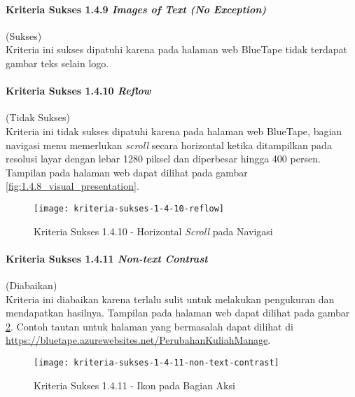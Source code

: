 \paragraph{Kriteria Sukses 1.4.9 \textit{Images of Text (No Exception)}}
\label{par:kepatuhan_bluetape_kriteria_sukses_1.4.9}
(Sukses)\\

Kriteria ini sukses dipatuhi karena pada halaman web BlueTape tidak terdapat gambar teks selain logo.

\paragraph{Kriteria Sukses 1.4.10 \textit{Reflow}}
\label{par:kepatuhan_bluetape_kriteria_sukses_1.4.10}
(Tidak Sukses)\\

Kriteria ini tidak sukses dipatuhi karena pada halaman web BlueTape, bagian navigasi menu memerlukan \textit{scroll} secara horizontal ketika ditampilkan pada resolusi layar dengan lebar 1280 piksel dan diperbesar hingga 400 persen. Tampilan pada halaman web dapat dilihat pada gambar \ref{fig:1.4.8_visual_presentation}.

\begin{figure}[H]
    \centering  
    \texttt{[image: kriteria-sukses-1-4-10-reflow]}  
    \caption[Kriteria Sukses 1.4.10 - Horizontal \textit{Scroll} pada Navigasi]{Kriteria Sukses 1.4.10 - Horizontal \textit{Scroll} pada Navigasi}
    \label{fig:1.4.10_reflow}  
\end{figure} 

\paragraph{Kriteria Sukses 1.4.11 \textit{Non-text Contrast}}
\label{par:kepatuhan_bluetape_kriteria_sukses_1.4.11}
(Diabaikan)\\

Kriteria ini diabaikan karena terlalu sulit untuk melakukan pengukuran dan mendapatkan hasilnya. Tampilan pada halaman web dapat dilihat pada gambar \ref{fig:1.4.11_non_text_contrast}. Contoh tautan untuk halaman yang bermasalah dapat dilihat di \url{https://bluetape.azurewebsites.net/PerubahanKuliahManage}.

\begin{figure}[H]
    \centering  
    \texttt{[image: kriteria-sukses-1-4-11-non-text-contrast]}  
    \caption[Kriteria Sukses 1.4.11 - Ikon pada Bagian Aksi]{Kriteria Sukses 1.4.11 - Ikon pada Bagian Aksi}
    \label{fig:1.4.11_non_text_contrast}  
\end{figure} 

